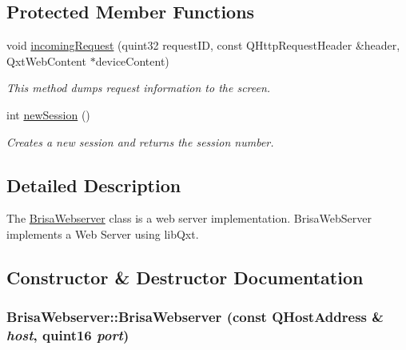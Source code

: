 \subsection*{Protected Member Functions}
\begin{DoxyCompactItemize}
\item 
void \hyperlink{classBrisaCore_1_1BrisaWebserver_af40a4df2aef119afad2a6e9dc9bb28a0}{incomingRequest} (quint32 requestID, const QHttpRequestHeader \&header, QxtWebContent $\ast$deviceContent)
\begin{DoxyCompactList}\small\item\em This method dumps request information to the screen. \item\end{DoxyCompactList}\item 
int \hyperlink{classBrisaCore_1_1BrisaWebserver_aabf7fff7c7e876c2f7b98678d8cbcaf3}{newSession} ()
\begin{DoxyCompactList}\small\item\em Creates a new session and returns the session number. \item\end{DoxyCompactList}\end{DoxyCompactItemize}


\subsection{Detailed Description}
The \hyperlink{classBrisaCore_1_1BrisaWebserver}{BrisaWebserver} class is a web server implementation. BrisaWebServer implements a Web Server using libQxt. 

\subsection{Constructor \& Destructor Documentation}
\hypertarget{classBrisaCore_1_1BrisaWebserver_aee321e007a6eb0e338c2a74df3249cba}{
\subsubsection[{BrisaWebserver}]{\setlength{\rightskip}{0pt plus 5cm}BrisaWebserver::BrisaWebserver (const QHostAddress \& {\em host}, \/  quint16 {\em port})}}
\label{classBrisaCore_1_1BrisaWebserver_aee321e007a6eb0e338c2a74df3249cba}


